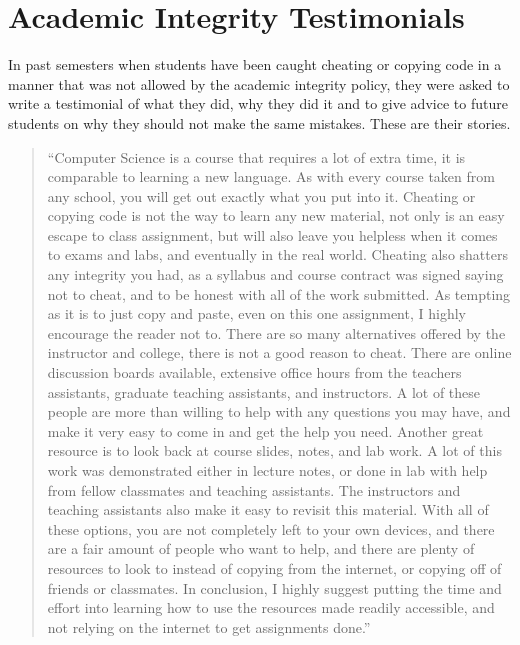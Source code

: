\documentclass[12pt]{scrartcl}
\begin{document}
\newpage
\section*{Academic Integrity Testimonials}

In past semesters when students have been caught cheating or copying code in
a manner that was not allowed by the academic integrity policy, they were asked
to write a testimonial of what they did, why they did it and to give advice
to future students on why they should not make the same mistakes.  These
are their stories.

\begin{quote}
``Computer Science is a course that requires a lot of extra time, it is comparable to learning a new language. As with every course taken from any school, you will get out exactly what you put into it. Cheating or copying code is not the way to learn any new material, not only is an easy escape to class assignment, but will also leave you helpless when it comes to exams and labs, and eventually in the real world. Cheating also shatters any integrity you had, as a syllabus and course contract was signed saying not to cheat, and to be honest with all of the work submitted. As tempting as it is to just copy and paste, even on this one assignment, I highly encourage the reader not to. There are so many alternatives offered by the instructor and college, there is not a good reason to cheat. There are online discussion boards available, extensive office hours from the teachers assistants, graduate teaching assistants, and instructors. A lot of these people are more than willing to help with any questions you may have, and make it very easy to come in and get the help you need. Another great resource is to look back at course slides, notes, and lab work. A lot of this work was demonstrated either in lecture notes, or done in lab with help from fellow classmates and teaching assistants. The instructors and teaching assistants also make it easy to revisit this material.  With all of these options, you are not completely left to your own devices, and there are a fair amount of people who want to help, and there are plenty of resources to look to instead of copying from the internet, or copying off of friends or classmates. In conclusion, I highly suggest putting the time and effort into learning how to use the resources made readily accessible, and not relying on the internet to get assignments done.'' 
\end{quote}
\end{document}
